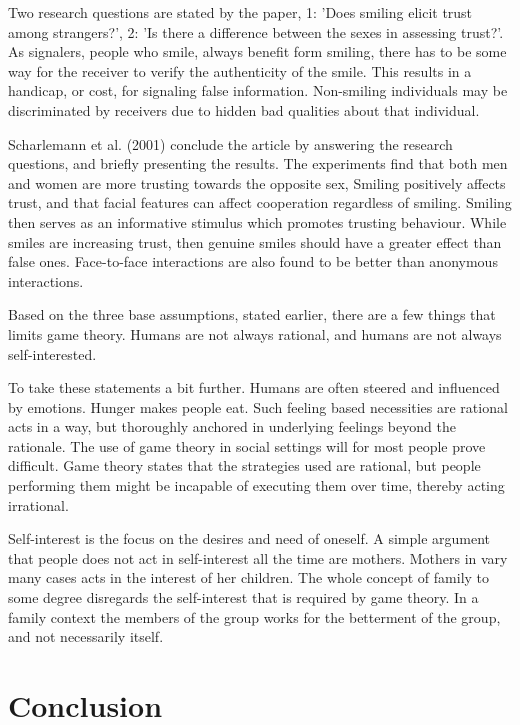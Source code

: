 \documentclass[12pt, a4paper]{article}
\begin{document}
Two research questions are stated by the paper, 1: 'Does smiling elicit trust
among strangers?', 2: 'Is there a difference between the sexes in assessing
trust?'. As signalers, people who smile, always benefit form smiling, there has
to be some way for the receiver to verify the authenticity of the smile. This
results in a handicap, or cost, for signaling false information. Non-smiling
individuals may be discriminated by receivers due to hidden bad qualities about
that individual.\cite{smile} 

Scharlemann et al. (2001) conclude the article by answering the research
questions, and briefly presenting the results. The experiments find that both
men and women are more trusting towards the opposite sex, Smiling positively
affects trust, and that facial features can affect cooperation regardless of
smiling. Smiling then serves as an informative stimulus which promotes trusting
behaviour. While smiles are increasing trust, then genuine smiles should have a
greater effect than false ones. Face-to-face interactions are also found to be
better than anonymous interactions.\cite{smile}


Based on the three base assumptions, stated earlier, there are a few things
that limits game theory. Humans are not always rational, and humans are not always
self-interested.

To take these statements a bit further. Humans are often steered and influenced
by emotions. Hunger makes people eat. Such feeling based necessities are
rational acts in a way, but thoroughly anchored in underlying feelings beyond
the rationale. The use of game theory in social settings will for most people
prove difficult. Game theory states that the strategies used are rational, but
people performing them might be incapable of executing them over time, thereby
acting irrational.   

Self-interest is the focus on the desires and need of oneself. A simple
argument that people does not act in self-interest all the time are mothers.
Mothers in vary many cases acts in the interest of her children. The whole
concept of family to some degree disregards the self-interest that is required
by game theory. In a family context the members of the group works for the
betterment of the group, and not necessarily itself. 

\section{Conclusion}\label{conclusions}
\end{document}
